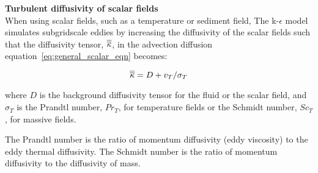 \par{\textbf{Turbulent diffusivity of scalar fields}\\}
When using scalar fields, such as a temperature or sediment field, The k-$\epsilon$ model
simulates subgridscale eddies by increasing the diffusivity  of the scalar fields such
that the diffusivity tensor, $\overline{\overline{\kappa}}$, in the advection diffusion equation~\ref{eq:general_scalar_eqn} becomes:

\begin{equation}\label{eq:keps_diff}
\overline{\overline{\kappa}} = D + v_T/\sigma_T
\end{equation}

where $D$ is the background diffusivity tensor for the fluid or the scalar field, and
$\sigma_T$ is the Prandtl number, $Pr_T$, for temperature fields or the Schmidt number, $Sc_T$,
for massive fields.  

The Prandtl number is the ratio of momentum diffusivity (eddy viscosity) to the eddy
thermal diffusivity. The Schmidt number is the ratio of momentum diffusivity to the
diffusivity of mass. 

